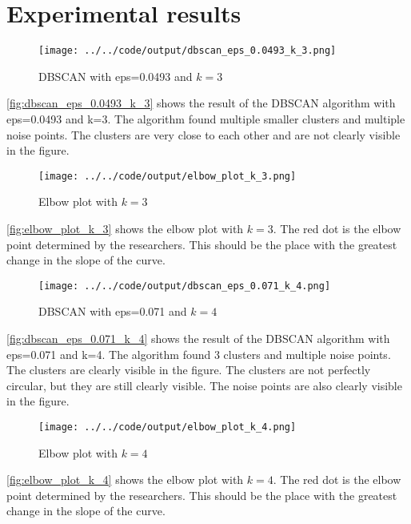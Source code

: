 \documentclass[twoside, a4paper, fleqn, reqno]{article}
\begin{document}
\section{Experimental results}

\begin {figure}[H]
	\centering
	\texttt{[image: ../../code/output/dbscan\_eps\_0.0493\_k\_3.png]}
	\caption{DBSCAN with eps=0.0493 and $k=3$}
	\label{fig:dbscan_eps_0.0493_k_3}
\end {figure}

\autoref{fig:dbscan_eps_0.0493_k_3} shows the result of the DBSCAN algorithm with eps=0.0493 and k=3.
The algorithm found multiple smaller clusters and multiple noise points.
The clusters are very close to each other and are not clearly visible in the figure.

\begin {figure}[H]
	\centering
	\texttt{[image: ../../code/output/elbow\_plot\_k\_3.png]}
	\caption{Elbow plot with $k=3$}
	\label{fig:elbow_plot_k_3}
\end {figure}

\autoref{fig:elbow_plot_k_3} shows the elbow plot with $k=3$.
The red dot is the elbow point determined by the researchers.
This should be the place with the greatest change in the slope of the curve.

\begin {figure}[H]
	\centering
	\texttt{[image: ../../code/output/dbscan\_eps\_0.071\_k\_4.png]}
	\caption{DBSCAN with eps=0.071 and $k=4$}
	\label{fig:dbscan_eps_0.071_k_4}
\end {figure}

\autoref{fig:dbscan_eps_0.071_k_4} shows the result of the DBSCAN algorithm with eps=0.071 and k=4.
The algorithm found 3 clusters and multiple noise points.
The clusters are clearly visible in the figure.
The clusters are not perfectly circular, but they are still clearly visible.
The noise points are also clearly visible in the figure.

\begin {figure}[H]
	\centering
	\texttt{[image: ../../code/output/elbow\_plot\_k\_4.png]}
	\caption{Elbow plot with $k=4$}
	\label{fig:elbow_plot_k_4}
\end {figure}

\autoref{fig:elbow_plot_k_4} shows the elbow plot with $k=4$.
The red dot is the elbow point determined by the researchers.
This should be the place with the greatest change in the slope of the curve.
\end{document}
